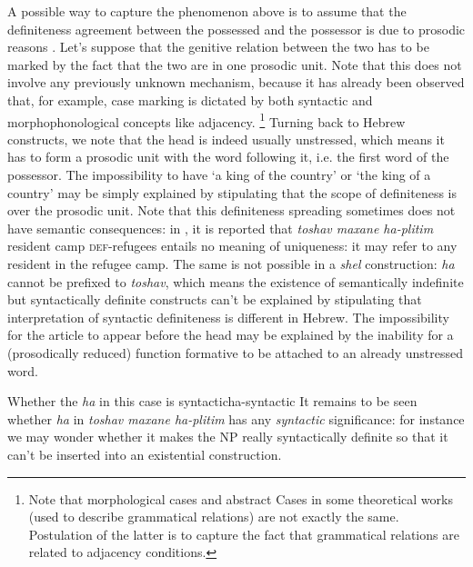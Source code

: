 \documentclass[a4paper, oneside, 12pt]{report}
\newcommand{\form}[1]{\emph{#1}}
\newcommand{\category}[1]{\textsc{#1}}
\newcommand{\translate}[1]{`#1'}
\begin{document}
A possible way to capture the phenomenon above is to assume that 
the definiteness agreement between the possessed and the possessor 
is due to prosodic reasons \citep{siloni2003prosodic}.
Let's suppose that the genitive relation between the two has to be marked 
by the fact that the two are in one prosodic unit.
Note that this does not involve any previously unknown mechanism,
because it has already been observed that, for example, case marking is dictated
by both syntactic and morphophonological concepts like adjacency.%
\footnote{
    Note that morphological cases 
    and abstract Cases in some theoretical works (used to describe grammatical relations)
    are not exactly the same.
    Postulation of the latter is to capture the fact that grammatical relations 
    are related to adjacency conditions.
}
Turning back to Hebrew constructs,
we note that the head is indeed usually unstressed,
which means it has to form a prosodic unit with the word following it,
i.e. the first word of the possessor.
The impossibility to have \translate{a king of the country} or \translate{the king of a country}
may be simply explained by stipulating that the scope of definiteness is over the prosodic unit.
Note that this definiteness spreading sometimes does not have semantic consequences:
in \citet{winter2005some}, it is reported that \form{toshav maxane ha-plitim} resident camp \category{def}-refugees
entails no meaning of uniqueness:
it may refer to any resident in the refugee camp.
The same is not possible in a \form{shel} construction: \form{ha} cannot be prefixed to \form{toshav},
which means the existence of semantically indefinite but syntactically definite constructs
can't be explained by stipulating that interpretation of syntactic definiteness is different in Hebrew.
The impossibility for the article to appear before the head may be explained by
the inability for a (prosodically reduced) function formative
to be attached to an already unstressed word.


\begin{todobox}{Whether the \form{ha} in this case is syntactic}{ha-syntactic}
    It remains to be seen whether \form{ha} in \form{toshav maxane ha-plitim}
    has any \emph{syntactic} significance:
    for instance we may wonder whether it makes the NP really syntactically definite
    so that it can't be inserted into an existential construction.
\end{todobox}
\end{document}
